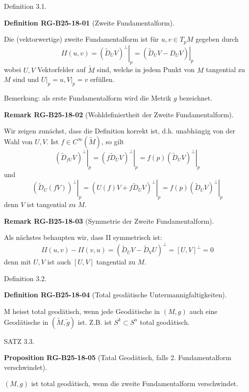 \documentclass[10pt, letterpaper]{article}
\newcommand{\CustomHeading}[3]{%
  \par\medskip\noindent%
  \textbf{#1 #2} \textnormal{(#3)}.\enskip%
}
\newenvironment{DEF}[2]{\begin{unitbox}\CustomHeading{Definition}{#1}{#2}}{\end{unitbox}}
\newenvironment{PROP}[2]{\begin{unitbox}\CustomHeading{Proposition}{#1}{#2}}{\end{unitbox}}
\newenvironment{REM}[2]{\begin{unitbox}\CustomHeading{Remark}{#1}{#2}}{\end{unitbox}}
\begin{document}
Definition 3.1. 


\begin{DEF}{RG-B25-18-01}{Zweite Fundamentalform}
Die (vektorwertige) zweite Fundamentalform ist für $u, v \in T_{p} M$ gegeben durch
$$
II(u, v)=\left.\left(\tilde{D}_{U} V\right)^{\perp}\right|_{p}=\left.\left(\tilde{D}_{U} V-D_{U} V\right)\right|_{p}
$$
wobei $U, V$ Vektorfelder auf $\tilde{M}$ sind, welche in jedem Punkt von $M$ tangential zu $M$ sind und $\left.U\right|_{p}=u,\left.V\right|_{p}=v$ erfüllen.
\end{DEF}


Bemerkung: als erste Fundamentalform wird die Metrik $g$ bezeichnet.

\begin{REM}{RG-B25-18-02}{Wohldefiniertheit der Zweite Fundamentalform}
Wir zeigen zunächst, dass die Definition korrekt ist, d.h. unabhängig von der Wahl von $U, V$. Ist $f \in C^{\infty}(\tilde{M})$, so gilt
$$
\left.\left(\tilde{D}_{f U} V\right)^{\perp}\right|_{p}=\left.\left(f \tilde{D}_{U} V\right)^{\perp}\right|_{p}=\left.f(p)\left(\tilde{D}_{U} V\right)^{\perp}\right|_{p}
$$
und
$$
\left.\left(\tilde{D}_{U}(f V)\right)^{\perp}\right|_{p}=\left.\left(U(f) V+f \tilde{D}_{U} V\right)^{\perp}\right|_{p}=\left.f(p)\left(\tilde{D}_{U} V\right)^{\perp}\right|_{p}
$$
denn $V$ ist tangential zu $M$.
\end{REM}


\begin{REM}{RG-B25-18-03}{Symmetrie der Zweite Fundamentalform}
Als nächstes behaupten wir, dass II symmetrisch ist:
$$
I I(u, v)-I I(v, u)=\left(\tilde{D}_{U} V-\tilde{D}_{V} U\right)^{\perp}=[U, V]^{\perp}=0
$$
denn mit $U, V$ ist auch $[U, V]$ tangential zu $M$.
\end{REM}


Definition 3.2. 


\begin{DEF}{RG-B25-18-04}{Total geodätische Untermannigfaltigkeiten}
M heisst total geodätisch, wenn jede Geodätische in $(M, g)$ auch eine Geodätische in $(\tilde{M}, \tilde{g})$ ist. Z.B. ist $S^{k} \subset S^{n}$ total geodätisch.
\end{DEF}

SATZ 3.3. 


\begin{PROP}{RG-B25-18-05}{Tatal Geodätisch, falls 2. Fundamentalform verschwindet}
$(M,g)$ ist total geodätisch, wenn die zweite Fundamentalform verschwindet.
\end{PROP}
\end{document}
